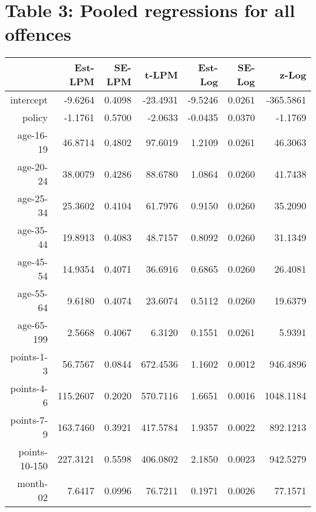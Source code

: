 \documentclass[10pt]{article}
\begin{document}






\section*{Table 3: Pooled regressions for all offences}




\begin{table}[ht]
\centering
\begin{tabular}{rrrrrrr}
  \hline
 & Est-LPM & SE-LPM & t-LPM & Est-Log & SE-Log & z-Log \\ 
  \hline
intercept & -9.6264 & 0.4098 & -23.4931 & -9.5246 & 0.0261 & -365.5861 \\ 
  policy & -1.1761 & 0.5700 & -2.0633 & -0.0435 & 0.0370 & -1.1769 \\ 
  age-16-19 & 46.8714 & 0.4802 & 97.6019 & 1.2109 & 0.0261 & 46.3063 \\ 
  age-20-24 & 38.0079 & 0.4286 & 88.6780 & 1.0864 & 0.0260 & 41.7438 \\ 
  age-25-34 & 25.3602 & 0.4104 & 61.7976 & 0.9150 & 0.0260 & 35.2090 \\ 
  age-35-44 & 19.8913 & 0.4083 & 48.7157 & 0.8092 & 0.0260 & 31.1349 \\ 
  age-45-54 & 14.9354 & 0.4071 & 36.6916 & 0.6865 & 0.0260 & 26.4081 \\ 
  age-55-64 & 9.6180 & 0.4074 & 23.6074 & 0.5112 & 0.0260 & 19.6379 \\ 
  age-65-199 & 2.5668 & 0.4067 & 6.3120 & 0.1551 & 0.0261 & 5.9391 \\ 
  points-1-3 & 56.7567 & 0.0844 & 672.4536 & 1.1602 & 0.0012 & 946.4896 \\ 
  points-4-6 & 115.2607 & 0.2020 & 570.7116 & 1.6651 & 0.0016 & 1048.1184 \\ 
  points-7-9 & 163.7460 & 0.3921 & 417.5784 & 1.9357 & 0.0022 & 892.1213 \\ 
  points-10-150 & 227.3121 & 0.5598 & 406.0802 & 2.1850 & 0.0023 & 942.5279 \\ 
  month-02 & 7.6417 & 0.0996 & 76.7211 & 0.1971 & 0.0026 & 77.1571 \\ 

\end{tabular}
\end{table}
\end{document}
